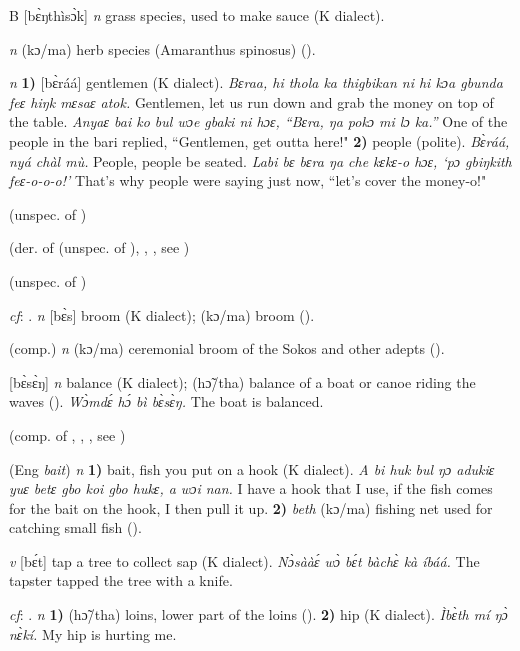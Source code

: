 \begin{letter}{B}
 [bɛ̀ŋthìsɔ̀k] \textit{n} grass species, used to make sauce (K dialect). 

 \textit{n} (kɔ/ma) herb species (Amaranthus spinosus) (\citealt{Pichl1967}). 

 \textit{n} \textbf{1)} [bɛ̀ráá] gentlemen (K dialect). \textit{Bɛraa, hi thola ka thigbikan ni hi kɔa gbunda feɛ hiŋk mɛsaɛ atok.} Gentlemen, let us run down and grab the money on top of the table. \textit{Anyaɛ bai ko bul wɔe gbaki ni hɔɛ, “Bɛra, ŋa pokɔ mi lɔ ka.”} One of the people in the bari replied, “Gentlemen, get outta here!" \textbf{2)} people (polite). \textit{Bɛ̀ráá, nyá chàl mù.} People, people be seated. \textit{Labi bɛ bɛra ŋa che kɛkɛ-o hɔɛ, ‘pɔ gbiŋkith feɛ-o-o-o!'} That’s why people were saying just now, “let's cover the money-o!"

 (unspec. of )

 (der. of  (unspec. of ), , , see ) 

 (unspec. of ) 

 \textit{cf}: . \textit{n} [bɛ̀s] broom (K dialect); (kɔ/ma) broom (\citealt{Pichl1967}). 

 (comp.) \textit{n} (kɔ/ma) ceremonial broom of the Sokos and other adepts (\citealt{Pichl1967}). 

 [bɛ̀sɛ̀ŋ] \textit{n} balance (K dialect); (hɔ̃/tha) balance of a boat or canoe riding the waves (\citealt{Pichl1967}). \textit{Wɔ̀mdɛ́ hɔ́ bì bɛ̀sɛ̀ŋ.} The boat is balanced.

 (comp. of , , , see ) 

 (Eng \textit{bait}) \textit{n} \textbf{1)} bait, fish you put on a hook (K dialect). \textit{A bi huk bul ŋɔ adukiɛ yuɛ betɛ gbo koi gbo hukɛ, a wɔi nan.} I have a hook that I use, if the fish comes for the bait on the hook, I then pull it up. \textbf{2)} \textit{beth} (kɔ/ma) fishing net used for catching small fish (\citealt{Pichl1967}). 

 \textit{v} [bɛ́t] tap a tree to collect sap (K dialect). \textit{Nɔ̀sààɛ́ wɔ̀ bɛ́t bàchɛ̀ kà íbáá.} The tapster tapped the tree with a knife.

 \textit{cf}: . \textit{n} \textbf{1)} (hɔ̃/tha) loins, lower part of the loins (\citealt{Pichl1967}). \textbf{2)} hip (K dialect). \textit{Ìbɛ̀th mí ŋɔ̀ nɛ̀kí.} My hip is hurting me.


\end{letter}
